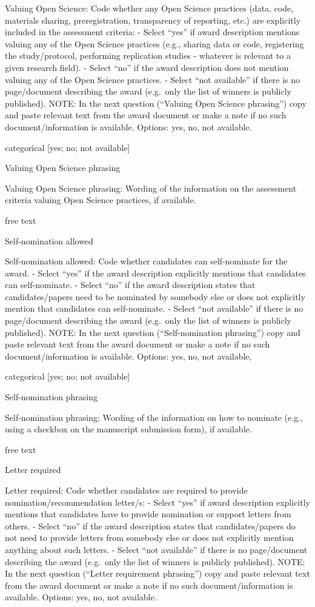 \documentclass[
]{article}
\begin{document}
Valuing Open Science: Code whether any Open Science practices (data,
code, materials sharing, preregistration, transparency of reporting,
etc.) are explicitly included in the assessment criteria: - Select
``yes'' if award description mentions valuing any of the Open Science
practices (e.g., sharing data or code, registering the study/protocol,
performing replication studies - whatever is relevant to a given
research field). - Select ``no'' if the award description does not
mention valuing any of the Open Science practices. - Select ``not
available'' if there is no page/document describing the award (e.g.~only
the list of winners is publicly published). NOTE: In the next question
(``Valuing Open Science phrasing'') copy and paste relevant text from
the award document or make a note if no such document/information is
available. Options: yes, no, not available.

categorical {[}yes; no; not available{]}

Valuing Open Science phrasing

Valuing Open Science phrasing: Wording of the information on the
assessment criteria valuing Open Science practices, if available.

free text

Self-nomination allowed

Self-nomination allowed: Code whether candidates can self-nominate for
the award. - Select ``yes'' if the award description explicitly mentions
that candidates can self-nominate. - Select ``no'' if the award
description states that candidates/papers need to be nominated by
somebody else or does not explicitly mention that candidates can
self-nominate. - Select ``not available'' if there is no page/document
describing the award (e.g.~only the list of winners is publicly
published). NOTE: In the next question (``Self-nomination phrasing'')
copy and paste relevant text from the award document or make a note if
no such document/information is available. Options: yes, no, not
available,

categorical {[}yes; no; not available{]}

Self-nomination phrasing

Self-nomination phrasing: Wording of the information on how to nominate
(e.g., using a checkbox on the manuscript submission form), if
available.

free text

Letter required

Letter required: Code whether candidates are required to provide
nomination/recommendation letter/s: - Select ``yes'' if award
description explicitly mentions that candidates have to provide
nomination or support letters from others. - Select ``no'' if the award
description states that candidates/papers do not need to provide letters
from somebody else or does not explicitly mention anything about such
letters. - Select ``not available'' if there is no page/document
describing the award (e.g.~only the list of winners is publicly
published). NOTE: In the next question (``Letter requirement phrasing'')
copy and paste relevant text from the award document or make a note if
no such document/information is available. Options: yes, no, not
available.
\end{document}
